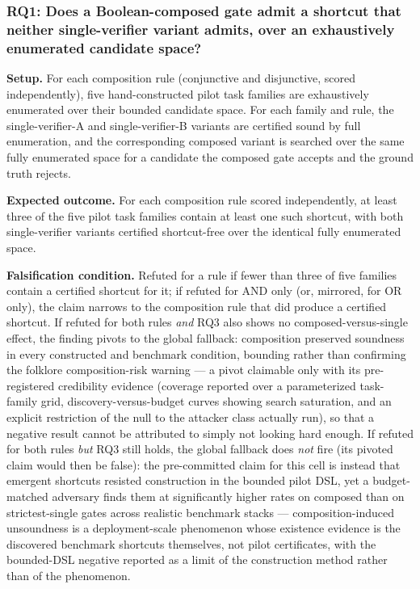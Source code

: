 \documentclass[11pt]{article}
\begin{document}
\subsubsection{RQ1: Does a Boolean-composed gate admit a shortcut that neither single-verifier variant admits, over an exhaustively enumerated candidate space?}
\textbf{Setup.} For each composition rule (conjunctive and disjunctive, scored independently), five hand-constructed pilot task families are exhaustively enumerated over their bounded candidate space. For each family and rule, the single-verifier-A and single-verifier-B variants are certified sound by full enumeration, and the corresponding composed variant is searched over the same fully enumerated space for a candidate the composed gate accepts and the ground truth rejects.

\textbf{Expected outcome.} For each composition rule scored independently, at least three of the five pilot task families contain at least one such shortcut, with both single-verifier variants certified shortcut-free over the identical fully enumerated space.

\textbf{Falsification condition.} Refuted for a rule if fewer than three of five families contain a certified shortcut for it; if refuted for AND only (or, mirrored, for OR only), the claim narrows to the composition rule that did produce a certified shortcut. If refuted for both rules \emph{and} RQ3 also shows no composed-versus-single effect, the finding pivots to the global fallback: composition preserved soundness in every constructed and benchmark condition, bounding rather than confirming the folklore composition-risk warning --- a pivot claimable only with its pre-registered credibility evidence (coverage reported over a parameterized task-family grid, discovery-versus-budget curves showing search saturation, and an explicit restriction of the null to the attacker class actually run), so that a negative result cannot be attributed to simply not looking hard enough. If refuted for both rules \emph{but} RQ3 still holds, the global fallback does \emph{not} fire (its pivoted claim would then be false): the pre-committed claim for this cell is instead that emergent shortcuts resisted construction in the bounded pilot DSL, yet a budget-matched adversary finds them at significantly higher rates on composed than on strictest-single gates across realistic benchmark stacks --- composition-induced unsoundness is a deployment-scale phenomenon whose existence evidence is the discovered benchmark shortcuts themselves, not pilot certificates, with the bounded-DSL negative reported as a limit of the construction method rather than of the phenomenon.
\end{document}
